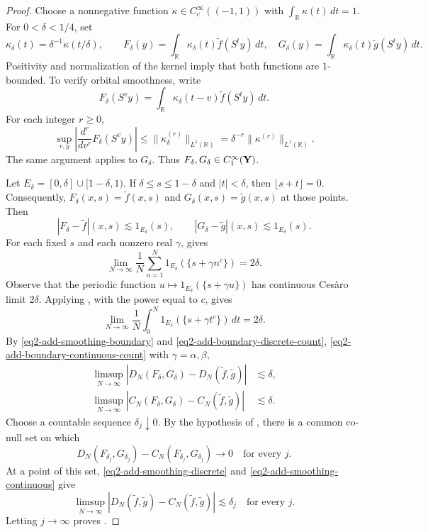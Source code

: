 \documentclass[reqno,12pt]{amsart}
\def \R {\mathbb R}
\numberwithin{equation}{section}
\begin{document}
\begin{proof}
Choose a nonnegative function $\kappa\in C_c^\infty((-1,1))$ with
$\displaystyle\int_\R\kappa(t)\,dt=1$. For $0<\delta<1/4$, set
\[
 \kappa_\delta(t)=\delta^{-1}\kappa(t/\delta),\qquad
 F_\delta(y)=\int_\R\kappa_\delta(t)\tilde f(S^t y)\,dt,
 \quad
 G_\delta(y)=\int_\R\kappa_\delta(t)\tilde g(S^t y)\,dt.
\]
Positivity and normalization of the kernel imply that both functions
are $1$-bounded. To verify orbital smoothness, write
\[
 F_\delta(S^v y)
 =\int_\R\kappa_\delta(t-v)\tilde f(S^t y)\,dt.
\]
For each integer $r\ge0$,
\[
 \sup_{v,y}\left|\frac{d^r}{dv^r}F_\delta(S^v y)\right|
 \le\|\kappa_\delta^{(r)}\|_{L^1(\R)}
 =\delta^{-r}\|\kappa^{(r)}\|_{L^1(\R)}.
\]
The same argument applies to $G_\delta$. Thus
$F_\delta,G_\delta\in C_1^\infty({\bf Y})$.

Let $E_\delta=[0,\delta]\cup[1-\delta,1)$. If
$\delta\le s\le1-\delta$ and $|t|<\delta$, then
$\lfloor s+t\rfloor=0$. Consequently,
$F_\delta(x,s)=\tilde f(x,s)$ and
$G_\delta(x,s)=\tilde g(x,s)$ at those points. Then
\begin{equation}
 |F_\delta-\tilde f|(x,s)\lesssim1_{E_\delta}(s),\qquad
 |G_\delta-\tilde g|(x,s)\lesssim1_{E_\delta}(s).
 \label{eq2-add-smoothing-boundary}
\end{equation}
For each fixed $s$ and each nonzero real $\gamma$,  gives
\begin{equation}
 \lim_{N\to\infty}\frac1N\sum_{n=1}^N
 1_{E_\delta}(\{s+\gamma n^c\})=2\delta.
 \label{eq2-add-boundary-discrete-count}
\end{equation}
Observe that the periodic function $u\mapsto1_{E_\delta}(\{s+\gamma u\})$
has continuous Ces\`aro limit $2\delta$. Applying , with the power equal to $c$, gives
\begin{equation}
 \lim_{N\to\infty}\frac1N\int_0^N
 1_{E_\delta}(\{s+\gamma t^c\})\,dt=2\delta.
 \label{eq2-add-boundary-continuous-count}
\end{equation}
By \eqref{eq2-add-smoothing-boundary} and
\eqref{eq2-add-boundary-discrete-count},
\eqref{eq2-add-boundary-continuous-count} with $\gamma=\alpha,\beta$,
\begin{align}
 \limsup_{N\to\infty}
 |D_N(F_\delta,G_\delta)-D_N(\tilde f,\tilde g)|
 &\lesssim\delta,\label{eq2-add-smoothing-discrete}\\
 \limsup_{N\to\infty}
 |C_N(F_\delta,G_\delta)-C_N(\tilde f,\tilde g)|
 &\lesssim\delta.\label{eq2-add-smoothing-continuous}
\end{align}
Choose a countable sequence $\delta_j\downarrow0$. By the hypothesis
of , there is a common co-null set on which
\[
 D_N(F_{\delta_j},G_{\delta_j})
 -C_N(F_{\delta_j},G_{\delta_j})\longrightarrow0
 \quad\text{for every }j.
\]
At a point of this set,
\eqref{eq2-add-smoothing-discrete} and \eqref{eq2-add-smoothing-continuous}
give
\[
 \limsup_{N\to\infty}
 |D_N(\tilde f,\tilde g)-C_N(\tilde f,\tilde g)|\lesssim\delta_j
 \quad\text{for every }j.
\]
Letting $j\to\infty$ proves .
\end{proof}
\end{document}

